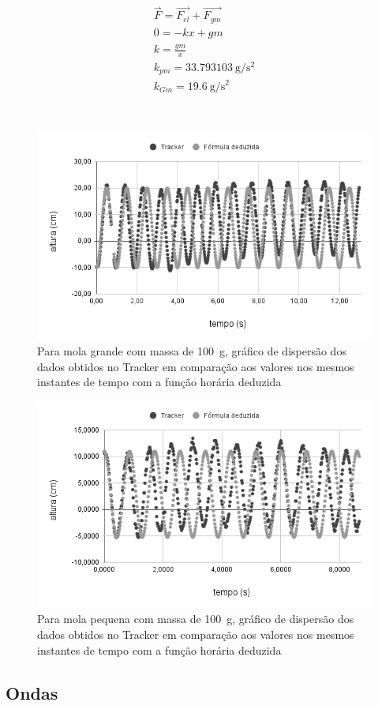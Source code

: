 \begin{align*}
    \vec{F} = \vec{F_{el}} + \vec{F_{gm}} \\
    0 = -kx + gm\\
    k = \frac{gm}{x}\\
    k_{pm} = \qty{33.793103}{\gram\per\second\squared}\\
    k_{Gm} = \qty{19.6}{\gram\per\second\squared}
\end{align*}

\(\) 



\begin{figure}[H]
    \centering
    \includegraphics[width=.5\linewidth]{fig/molaG}
    \caption{Para mola grande com massa de \qty{100}{g}, gráfico de dispersão dos dados obtidos no Tracker em comparação aos valores nos mesmos instantes de tempo com a função horária deduzida}\label{molaG}
\end{figure}

\begin{figure}[H]
    \centering
    \includegraphics[width=.5\linewidth]{fig/molaP}
    \caption{Para mola pequena com massa de \qty{100}{g}, gráfico de dispersão dos dados obtidos no Tracker em comparação aos valores nos mesmos instantes de tempo com a função horária deduzida}\label{molaP}
\end{figure}
            
\subsection{Ondas}

    

